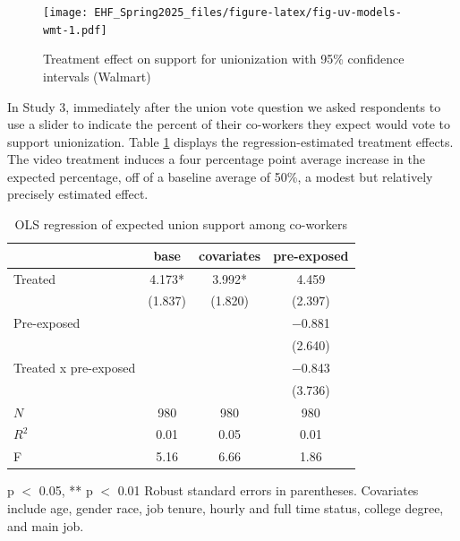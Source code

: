 \documentclass[
  11pt,
  oneside]{article}
\begin{document}
\begin{figure}
\centering
\texttt{[image: EHF\_Spring2025\_files/figure-latex/fig-uv-models-wmt-1.pdf]}
\caption{\label{fig:fig-uv-models-wmt}Treatment effect on support for unionization with 95\% confidence intervals (Walmart)}
\end{figure}

In Study 3, immediately after the union vote question we asked respondents to use a slider to indicate the percent of their co-workers they expect would vote to support unionization. Table \ref{tab:tab-usupp-models-wmt} displays the regression-estimated treatment effects. The video treatment induces a four percentage point average increase in the expected percentage, off of a baseline average of 50\%, a modest but relatively precisely estimated effect.

\begin{table}
\centering
\caption{\label{tab:tab-uv-models-wmt}OLS regression of expected union support among co-workers \label{tab:tab-usupp-models-wmt}}
\centering
\begin{threeparttable}
\begin{tabular}[t]{lccc}
\toprule
  & base & covariates & pre-exposed\\
\midrule
Treated & \num{4.173}* & \num{3.992}* & \num{4.459}\\
 & (\num{1.837}) & (\num{1.820}) & (\num{2.397})\\
Pre-exposed &  &  & \num{-0.881}\\
 &  &  & (\num{2.640})\\
Treated x pre-exposed &  &  & \num{-0.843}\\
 &  &  & (\num{3.736})\\
\midrule
$N$ & \num{980} & \num{980} & \num{980}\\
$R^2$ & \num{0.01} & \num{0.05} & \num{0.01}\\
F & \num{5.16} & \num{6.66} & \num{1.86}\\
\bottomrule
\end{tabular}
\begin{tablenotes}
\item * p $<$ 0.05, ** p $<$ 0.01 Robust standard errors in parentheses. Covariates include age, gender race, job tenure, hourly and full time status, college degree, and main job.
\end{tablenotes}
\end{threeparttable}
\end{table}
\end{document}
